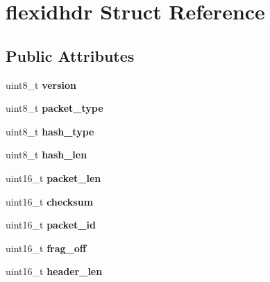 \hypertarget{structflexidhdr}{}\section{flexidhdr Struct Reference}
\label{structflexidhdr}
\subsection*{Public Attributes}
\begin{DoxyCompactItemize}
\item 
uint8\+\_\+t {\bfseries version}\hypertarget{structflexidhdr_a040648453cb452e600995d86a1432264}{}\label{structflexidhdr_a040648453cb452e600995d86a1432264}

\item 
uint8\+\_\+t {\bfseries packet\+\_\+type}\hypertarget{structflexidhdr_a0d1be6716bc037d0742bb7905c554b7d}{}\label{structflexidhdr_a0d1be6716bc037d0742bb7905c554b7d}

\item 
uint8\+\_\+t {\bfseries hash\+\_\+type}\hypertarget{structflexidhdr_a4664d30de167966734c63a9602aa67d8}{}\label{structflexidhdr_a4664d30de167966734c63a9602aa67d8}

\item 
uint8\+\_\+t {\bfseries hash\+\_\+len}\hypertarget{structflexidhdr_ac0e058519cc822eb3cb525217bda557f}{}\label{structflexidhdr_ac0e058519cc822eb3cb525217bda557f}

\item 
uint16\+\_\+t {\bfseries packet\+\_\+len}\hypertarget{structflexidhdr_a25cbbee361b8bff5511611a5f72cff57}{}\label{structflexidhdr_a25cbbee361b8bff5511611a5f72cff57}

\item 
uint16\+\_\+t {\bfseries checksum}\hypertarget{structflexidhdr_ae1825703c47432515e7eddb823e3489f}{}\label{structflexidhdr_ae1825703c47432515e7eddb823e3489f}

\item 
uint16\+\_\+t {\bfseries packet\+\_\+id}\hypertarget{structflexidhdr_a1fc7a84deb9e0042941f7c983f240691}{}\label{structflexidhdr_a1fc7a84deb9e0042941f7c983f240691}

\item 
uint16\+\_\+t {\bfseries frag\+\_\+off}\hypertarget{structflexidhdr_a7aa77d8aec125c11801198ca617e5ebe}{}\label{structflexidhdr_a7aa77d8aec125c11801198ca617e5ebe}

\item 
uint16\+\_\+t {\bfseries header\+\_\+len}\hypertarget{structflexidhdr_a1e5f6919e501e8aef925b4d78095ea06}{}\label{structflexidhdr_a1e5f6919e501e8aef925b4d78095ea06}


\end{DoxyCompactItemize}

